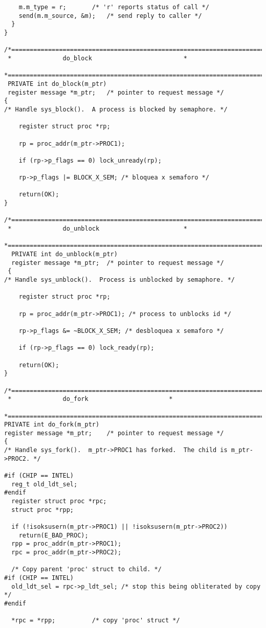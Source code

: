 \begin{verbatim}
	m.m_type = r;		/* 'r' reports status of call */
	send(m.m_source, &m);	/* send reply to caller */
  }
}

/*===========================================================================*
 *				do_block					     *
 *===========================================================================*/
 PRIVATE int do_block(m_ptr)
 register message *m_ptr;	/* pointer to request message */
{
/* Handle sys_block().  A process is blocked by semaphore. */

	register struct proc *rp;

	rp = proc_addr(m_ptr->PROC1);

	if (rp->p_flags == 0) lock_unready(rp);

	rp->p_flags |= BLOCK_X_SEM; /* bloquea x semaforo */

	return(OK);
}

/*===========================================================================*
 *				do_unblock					     *
 *===========================================================================*/
  PRIVATE int do_unblock(m_ptr)
  register message *m_ptr;	/* pointer to request message */
 {
/* Handle sys_unblock().  Process is unblocked by semaphore. */

 	register struct proc *rp;

 	rp = proc_addr(m_ptr->PROC1); /* process to unblocks id */

 	rp->p_flags &= ~BLOCK_X_SEM; /* desbloquea x semaforo */

 	if (rp->p_flags == 0) lock_ready(rp);

 	return(OK);
}

/*===========================================================================*
 *				do_fork					     *
 *===========================================================================*/
PRIVATE int do_fork(m_ptr)
register message *m_ptr;	/* pointer to request message */
{
/* Handle sys_fork().  m_ptr->PROC1 has forked.  The child is m_ptr->PROC2. */

#if (CHIP == INTEL)
  reg_t old_ldt_sel;
#endif
  register struct proc *rpc;
  struct proc *rpp;

  if (!isoksusern(m_ptr->PROC1) || !isoksusern(m_ptr->PROC2))
	return(E_BAD_PROC);
  rpp = proc_addr(m_ptr->PROC1);
  rpc = proc_addr(m_ptr->PROC2);

  /* Copy parent 'proc' struct to child. */
#if (CHIP == INTEL)
  old_ldt_sel = rpc->p_ldt_sel;	/* stop this being obliterated by copy */
#endif

  *rpc = *rpp;			/* copy 'proc' struct */


\end{verbatim}
